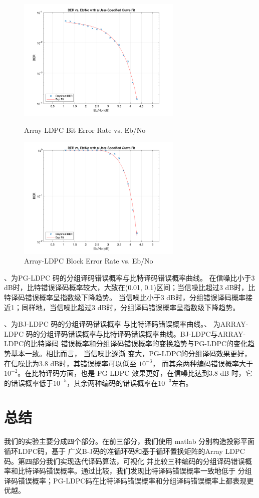 \documentclass[lang=cn,11pt,a4paper,numbers]{elegantpaper}
\begin{document}
\begin{figure}[htbp]
    \begin{minipage}[t]{0.5\linewidth}
    \centering
    \includegraphics[width=3.1in]{figure/array_bit_er.png}
    \caption{Array-LDPC Bit Error Rate vs. Eb/No}
    \label{fig:array_bit_er}
    \end{minipage}%
    \begin{minipage}[t]{0.5\linewidth}
    \centering
    \includegraphics[width=3.1in]{figure/array_block_er.png}
    \caption{Array-LDPC Block Error Rate vs. Eb/No}
    \label{fig:array_block_er}
    \end{minipage}
    \end{figure}

    

、为PG-LDPC 码的分组译码错误概率与比特译码错误概率曲线。
在信噪比小于3 dB时，比特错误译码概率较大，大致在(0.01, 0.1)区间；当信噪比超过3 dB时，比特译码错误概率呈指数级下降趋势。
当信噪比小于3 dB时，分组错误译码概率接近1；同样地，当信噪比超过3 dB时，分组译码错误概率呈指数级下降趋势。

、为BJ-LDPC 码的分组译码错误概率
与比特译码错误概率曲线。、
为ARRAY-LDPC 码的分组译码错误概率与比特译码错误概率曲线。BJ-LDPC与ARRAY-LDPC的比特译码
错误概率和分组译码错误概率的变换趋势与PG-LDPC的变化趋势基本一致。相比而言， 当信噪比逐渐
变大，PG-LDPC的分组译码效果更好，在信噪比为3.8 dB时，其错误概率可以低至 \(10^{-3}\)，
而其余两种编码错误概率大于\(10^{-2}\)。在比特译码方面，也是 PG-LDPC 效果更好，在信噪比达到3.8 dB
时，它的错误概率低于\(10^{-5}\)，其余两种编码的错误概率在\(10^{-3}\)左右。


\section{总结}
我们的实验主要分成四个部分。在前三部分，我们使用 matlab 分别构造投影平面循环LDPC码，基于
广义B-J码的准循环码和基于循环置换矩阵的Array LDPC码。第四部分我们实现迭代译码算法，可视化
并比较三种编码的分组译码错误概率和比特译码错误概率。通过比较，我们发现比特译码错误概率一致地低于
分组译码错误概率；PG-LDPC码在比特译码错误概率和分组译码错误概率上都表现更优越。


\end{document}
